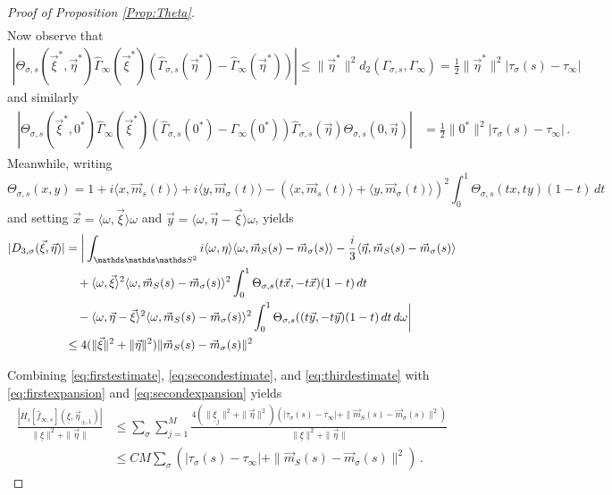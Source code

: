 \documentclass{article}
\newcommand\uxi{{\underline \xi}}
\newcommand\vxi{{\vec \xi}}
\newcommand\veta{{\vec \eta}}
\begin{document}
\begin{proof}[Proof of Proposition \ref{Prop:Theta}]
\begin{align}
\end{align}
Now observe that
\begin{align}
\label{eq:firstestimate}
\left| \Theta_{\sigma, s}(\vxi^*, \veta^*) \widehat \Gamma_{\infty}(\vxi^*) \left(\widehat \Gamma_{\sigma, s}(\veta^*) 
- \widehat \Gamma_\infty(\veta^*)\right) \right| 
\leq  \|\veta^*\|^2 d_2(\Gamma_{\sigma, s}, \Gamma_{\infty}) 
= 
\frac 12  \|\veta^*\|^2 |\tau_{\sigma}(s) - \tau_\infty|
\end{align}
and similarly
\begin{align}
\begin{split}
\label{eq:secondestimate}
\left| \Theta_{\sigma,s}(\vxi^*, 0^*) \widehat\Gamma_{\infty}(\vxi^*) \left(\widehat \Gamma_{\sigma, s}(0^*) - \widehat 
\Gamma_\infty(0^*)\right) \widehat\Gamma_{\sigma, s}(\veta)\Theta_{\sigma, s}(0, \veta) \right| 
&=
\frac 12 \|0^*\|^2 |\tau_\sigma(s) - \tau_\infty| \, .
\end{split}
\end{align}
Meanwhile, writing 
\[
\Theta_{\sigma, s}(x,y) = 1 + i\langle x, \vec m_s(t)\rangle + i\langle y, \vec m_\sigma(t)\rangle - \left(\langle x, 
\vec m_s(t)\rangle + \langle y, \vec m_\sigma(t)\rangle\right)^2 \int_0^1 \Theta_{\sigma, s}(tx, ty) (1 - t) \, dt
\]
and setting $\vec x=\langle\omega, \vxi\rangle\omega$ and  $\vec y=\langle\omega, \veta-\vxi\rangle\omega$, yields
\begin{equation}\label{eq:thirdestimate}
\begin{aligned}
|D_{3,\sigma}(\vxi,\veta)|&= 
\bigg|
\int_{\mathds
\mathds
\mathds S^2} i \langle\omega, \eta\rangle\langle\omega , \vec m_S(s) - \vec m_\sigma(s)\rangle - \frac i 3 \langle 
\veta, \vec m_S(s) - \vec m_\sigma(s) \rangle
\\
&\quad +
\langle\omega, \vxi\rangle^2\langle \omega  , \vec m_S(s) - \vec m_\sigma(s) \rangle^2 \int_0^1 
\Theta_{\sigma,s}(t\vec x, -t\vec x) (1 - t) \, dt
\\
&\quad -
\langle\omega, \veta - \vxi\rangle^2\langle\omega, \vec m_S(s) - \vec m_\sigma(s)\rangle^2 \int_0^1 \Theta_{\sigma, 
s}((t\vec y, -t\vec y) (1 - t) \, dt \, d\omega \bigg|
\\
&\leq 
4(\|\vxi\|^2 + \|\veta\|^2) \|\vec m_S(s) - \vec m_\sigma(s)\|^2 %
\end{aligned}
\end{equation}

Combining \eqref{eq:firstestimate}, \eqref{eq:secondestimate}, and \eqref{eq:thirdestimate} with 
\eqref{eq:firstexpansion} and \eqref{eq:secondexpansion} yields
\begin{align*}
\frac{\left|H_s[\hat f_{\infty,s}](\uxi,\veta_{\pm,1})\right|}
{\|\uxi\|^2 
+ 
\|\veta\|}  
&\leq \sum_{\sigma}\sum_{j = 1}^M \frac{4(\|\uxi_j\|^2 + \|\veta\|^2)(|\tau_\sigma(s) - \tau_\infty| + \|\vec m_S(s) - 
\vec m_\sigma(s)\|^2)}{\|\uxi\|^2 
+ 
\|\veta\|} 
\\
&\leq 
C M\sum_\sigma  \left(|\tau_\sigma(s) - \tau_\infty| + \|\vec m_S(s) - \vec m_\sigma(s)\|^2\right) \, .
\end{align*}

\end{proof}
\end{document}
